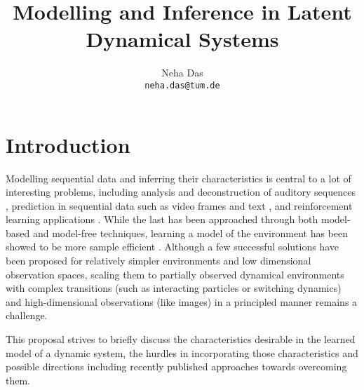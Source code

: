 \documentclass[10pt,twocolumn,letterpaper]{article}
\begin{document}
	
	\title{Modelling and Inference in Latent Dynamical Systems}
	
	\author{Neha Das\\
		{\tt\small neha.das@tum.de}}
	
	\maketitle
	
	
	\section{Introduction}
	Modelling sequential data and inferring their characteristics is central to a lot of interesting problems, including analysis and deconstruction of auditory sequences \cite{turner2010statistical}, prediction in sequential data such as video frames \cite{jayaraman2018time} and text \cite{xie2017neural}, and reinforcement learning applications \cite{deisenroth2011pilco}. While the last has been approached through both model-based and model-free techniques, learning a model of the environment has been showed to be more sample efficient \cite{atkeson1997comparison}. Although a few successful solutions have been proposed for relatively simpler environments and low dimensional observation spaces, scaling them to partially observed dynamical environments with complex transitions (such as interacting particles or switching dynamics) and high-dimensional observations (like images) in a principled manner remains a challenge. 
	
	This proposal strives to briefly discuss the characteristics desirable in the learned model of a dynamic system, the hurdles in incorporating those characteristics and possible directions including recently published approaches towards overcoming them.
	
\end{document}
